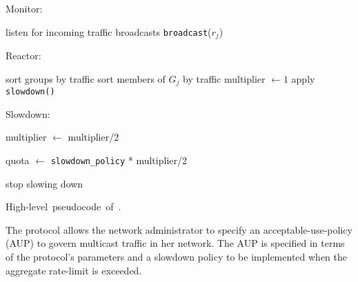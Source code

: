 \begin{algorithm}[t]
Monitor:
\begin{algorithmic}[1]
\STATE listen for incoming traffic broadcasts
         \STATE \verb|broadcast|($r_j$)
   \ENDIF
\ENDFOR
\end{algorithmic}

\medskip
Reactor:
\begin{algorithmic}[1]
\STATE sort groups by traffic
   \STATE sort members of $G_j$ by traffic
      \STATE multiplier $\gets 1$
      \STATE apply \verb|slowdown()|
   \ENDIF
\ENDIF
\end{algorithmic}

\medskip
Slowdown:
\begin{algorithmic}[1]
   \STATE multiplier $\gets$ multiplier/2
\ENDIF

\STATE quota $\gets$ \verb|slowdown_policy| * multiplier/2

   \STATE stop slowing down
\ENDIF
\end{algorithmic}
\medskip

\label{pcode}
\caption{\hbox{\tenhv\noindent High-level pseudocode of \sysname{}.} }
\end{algorithm}

The \sysname{} protocol allows the network administrator to specify an acceptable-use-policy (AUP) to govern multicast traffic in her network. The AUP is specified in terms of the protocol's parameters and a slowdown policy to be implemented when the aggregate rate-limit is exceeded.

